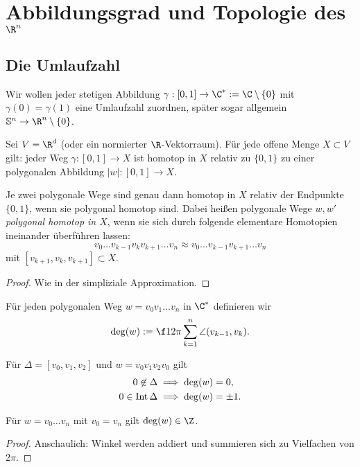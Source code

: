 \chapter{Abbildungsgrad und Topologie des \texorpdfstring{$\R^n$}{R\textasciicircum n}}



\section{Die Umlaufzahl}


Wir wollen jeder stetigen Abbildung $\gamma: [0,1] \to \C^* := \C \setminus \{0\}$ mit $\gamma(0) = \gamma(1)$ eine Umlaufzahl zuordnen, später sogar allgemein $\S^n \to \R^n \setminus \{0\}$.


\begin{st}
	Sei $V = \R^d$ (oder ein normierter $\R$-Vektorraum).
	Für jede offene Menge $X \subset V$ gilt:
	jeder Weg $\gamma: [0,1] \to X$ ist homotop in $X$ relativ zu $\{0, 1\}$ zu einer polygonalen Abbildung $|w|: [0,1] \to X$.

	Je zwei polygonale Wege sind genau dann homotop in $X$ relativ der Endpunkte $\{0,1\}$, wenn sie polygonal homotop sind.
	Dabei heißen polygonale Wege $w, w'$ \emph{polygonal homotop in $X$}, wenn sie sich durch folgende elementare Homotopien ineinander überführen lassen:
	\[
		v_0 \dotsc v_{k-1} v_k v_{k+1} \dotsc v_n \approx v_0 \dotsc v_{k-1} v_{k+1} \dotsc v_n
	\]
	mit $[v_{k+1}, v_k, v_{k+1}] \subset X$.
	\begin{proof}
		Wie in der simpliziale Approximation.
	\end{proof}
\end{st}

\begin{df}
	Für jeden polygonalen Weg $w = v_0 v_1 \dotsc v_n$ in $\C^*$ definieren wir
	\[
		\deg(w) := \f 1{2\pi} \sum_{k=1}^n \angle (v_{k-1}, v_k).
	\]
\end{df}

\begin{ex}
	Für $\Delta = [v_0, v_1, v_2]$ und $w = v_0 v_1 v_2 v_0$ gilt
	\begin{align*}
		0 \not\in \Delta & \implies \deg(w) = 0, \\
		0 \in \operatorname{Int}\Delta & \implies \deg(w) = \pm 1.
	\end{align*}
\end{ex}

\begin{lem}
	Für $w = v_0 \dotsc v_n$ mit $v_0 = v_n$ gilt $\deg(w) \in \Z$.
	\begin{proof}
		Anschaulich: Winkel werden addiert und summieren sich zu Vielfachen von $2\pi$.
	\end{proof}
\end{lem}

